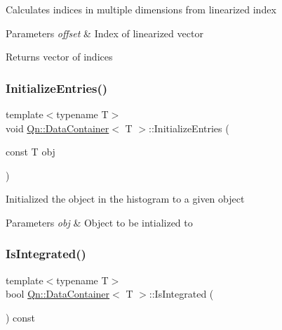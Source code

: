 Calculates indices in multiple dimensions from linearized index 
\begin{DoxyParams}{Parameters}
{\em offset} & Index of linearized vector \\
\hline
\end{DoxyParams}
\begin{DoxyReturn}{Returns}
vector of indices 
\end{DoxyReturn}
\mbox{\label{classQn_1_1DataContainer_a2baf9c75f0652ea0a0ef30aaf2ce8deb}} 
\subsubsection{\texorpdfstring{Initialize\+Entries()}{InitializeEntries()}}
{\footnotesize\ttfamily template$<$typename T$>$ \\
void \mbox{\hyperlink{classQn_1_1DataContainer}{Qn\+::\+Data\+Container}}$<$ T $>$\+::Initialize\+Entries (\begin{DoxyParamCaption}\item[{const T}]{obj }\end{DoxyParamCaption})\hspace{0.3cm}{\ttfamily [inline]}}

Initialized the object in the histogram to a given object 
\begin{DoxyParams}{Parameters}
{\em obj} & Object to be intialized to \\
\hline
\end{DoxyParams}
\mbox{\label{classQn_1_1DataContainer_a5cb38267726d0c1e2196f51d066e306f}} 
\subsubsection{\texorpdfstring{Is\+Integrated()}{IsIntegrated()}}
{\footnotesize\ttfamily template$<$typename T$>$ \\
bool \mbox{\hyperlink{classQn_1_1DataContainer}{Qn\+::\+Data\+Container}}$<$ T $>$\+::Is\+Integrated (\begin{DoxyParamCaption}{ }\end{DoxyParamCaption}) const\hspace{0.3cm}{\ttfamily [inline]}}

